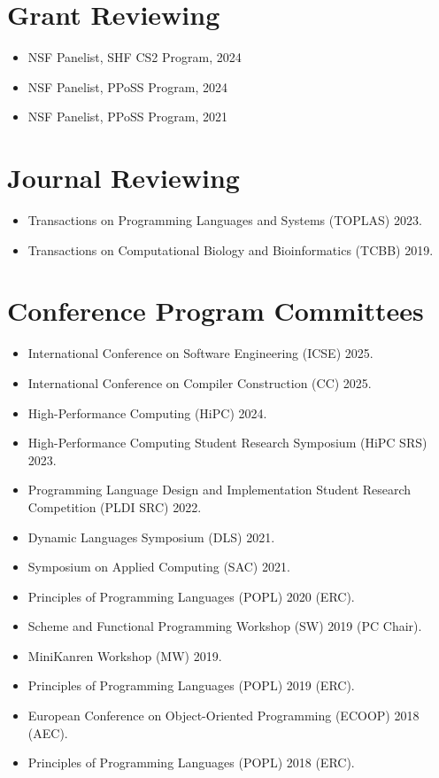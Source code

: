 \documentclass[line]{res}
\begin{document}
\begin{resume}
\section{\large Grant Reviewing} \vspace{0.45cm}
\begin{itemize}
  \item NSF Panelist, SHF CS2 Program, 2024
  \item NSF Panelist, PPoSS Program, 2024
  \item NSF Panelist, PPoSS Program, 2021
\end{itemize}

\section{\large Journal Reviewing} \vspace{0.45cm}
\begin{itemize}
  \item Transactions on Programming Languages and Systems (TOPLAS) 2023.
  \item Transactions on Computational Biology and Bioinformatics (TCBB) 2019. 
\end{itemize}

\section{\large Conference Program Committees} \vspace{0.45cm}
\begin{itemize}
  \item International Conference on Software Engineering (ICSE) 2025.
  \item International Conference on Compiler Construction (CC) 2025.
  \item High-Performance Computing (HiPC) 2024.
  \item High-Performance Computing Student Research Symposium (HiPC SRS) 2023.
  \item Programming Language Design and Implementation Student Research Competition (PLDI SRC) 2022.
  \item Dynamic Languages Symposium (DLS) 2021.
  \item Symposium on Applied Computing (SAC) 2021.
  \item Principles of Programming Languages (POPL) 2020 (ERC).
  \item Scheme and Functional Programming Workshop (SW) 2019 (PC Chair).
  \item MiniKanren Workshop (MW) 2019.
  \item Principles of Programming Languages (POPL) 2019 (ERC).
  \item European Conference on Object-Oriented Programming (ECOOP) 2018 (AEC).
  \item Principles of Programming Languages (POPL) 2018 (ERC).
\end{itemize}


\end{resume}
\end{document}
